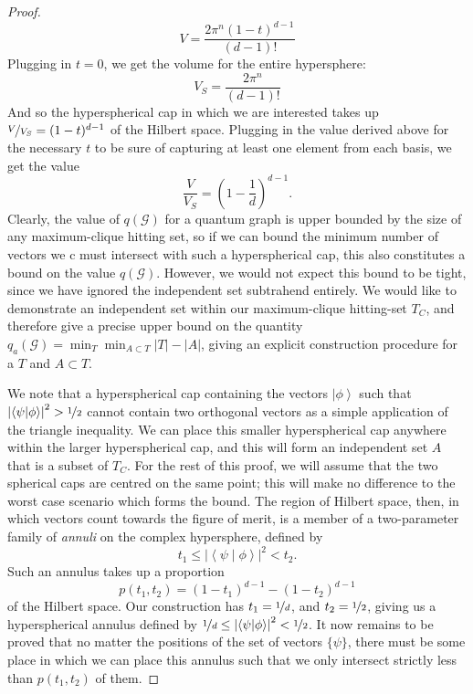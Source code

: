 \documentclass{amsart}
\theoremstyle{definition}
\newcommand{\ket}[1]{{\left\vert{#1}\right\rangle}}
\newcommand{\sprod}[2]{\left|\left< {#1} \middle| {#2} \right>\right|}
\begin{document}
\begin{proof}
\begin{equation}V=\frac{2\pi^n(1-t)^{d-1}}{(d-1)!}\end{equation}
Plugging in $t=0$, we get the volume for the entire hypersphere:
\begin{equation}V_S=\frac{2\pi^n}{(d-1)!}\end{equation}
And so the hyperspherical cap in which we are interested takes up $\nicefrac{V}{V_S}=(1-t)^{d-1}$ of the Hilbert space. Plugging in the value derived above for the necessary $t$ to be sure of capturing at least one element from each basis, we get the value
\begin{equation}
\frac{V}{V_S}=\left(1-\frac1d \right)^{d-1}.
\end{equation}
Clearly, the value of $q(\mathcal{G})$ for a quantum graph is upper bounded by the size of any maximum-clique hitting set, so if we can bound the minimum number of vectors we c must intersect with such a hyperspherical cap, this also constitutes a bound on the value $q(\mathcal{G})$. However, we would not expect this bound to be tight, since we have ignored the independent set subtrahend entirely. We would like to demonstrate an independent set within our maximum-clique hitting-set $T_C$, and therefore give a precise upper bound on the quantity $q_a(\mathcal{G})=\min_T \min_{A\subset T} |T|-|A|$, giving an explicit construction procedure for a $T$ and $A\subset T$.

We note that a hyperspherical cap containing the vectors $\ket{\phi}$ such that $\sprod{\psi}{\phi}^2> \nicefrac12$ cannot contain two orthogonal vectors as a simple application of the triangle inequality. We can place this smaller hyperspherical cap anywhere within the larger hyperspherical cap, and this will form an independent set $A$ that is a subset of $T_C$. For the rest of this proof, we will assume that the two spherical caps are centred on the same point; this will make no difference to the worst case scenario which forms the bound. The region of Hilbert space, then, in which vectors count towards the figure of merit, is a member of a two-parameter family of \emph{annuli} on the complex hypersphere, defined by
\begin{equation}
t_1\leq\sprod{\psi}{\phi}^2< t_2.
\end{equation}
Such an annulus takes up a proportion 
\begin{equation}p(t_1,t_2)=\left(1-t_1 \right)^{d-1}-\left(1-t_2 \right)^{d-1}\end{equation}
of the Hilbert space. Our construction has $t_1=\nicefrac1d$, and $t_2=\nicefrac12$, giving us a hyperspherical annulus defined by
$\nicefrac1d\leq\sprod{\psi}{\phi}^2< \nicefrac12$.
It now remains to be proved that no matter the positions of the set of vectors $\{\psi\}$, there must be some place in which we can place this annulus such that we only intersect strictly less than $p(t_1,t_2)$ of them. 


\end{proof}
\end{document}
